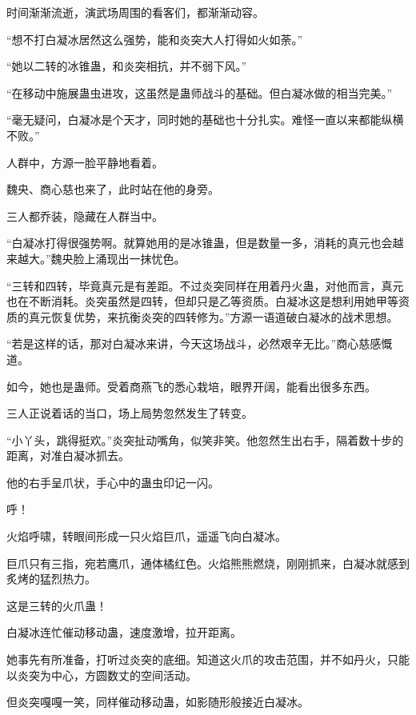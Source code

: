 
\begin{this_body}



时间渐渐流逝，演武场周围的看客们，都渐渐动容。

“想不打白凝冰居然这么强势，能和炎突大人打得如火如荼。”

“她以二转的冰锥蛊，和炎突相抗，并不弱下风。”

“在移动中施展蛊虫进攻，这虽然是蛊师战斗的基础。但白凝冰做的相当完美。”

“毫无疑问，白凝冰是个天才，同时她的基础也十分扎实。难怪一直以来都能纵横不败。”

人群中，方源一脸平静地看着。

魏央、商心慈也来了，此时站在他的身旁。

三人都乔装，隐藏在人群当中。

“白凝冰打得很强势啊。就算她用的是冰锥蛊，但是数量一多，消耗的真元也会越来越大。”魏央脸上涌现出一抹忧色。

“三转和四转，毕竟真元是有差距。不过炎突同样在用着丹火蛊，对他而言，真元也在不断消耗。炎突虽然是四转，但却只是乙等资质。白凝冰这是想利用她甲等资质的真元恢复优势，来抗衡炎突的四转修为。”方源一语道破白凝冰的战术思想。

“若是这样的话，那对白凝冰来讲，今天这场战斗，必然艰辛无比。”商心慈感慨道。

如今，她也是蛊师。受着商燕飞的悉心栽培，眼界开阔，能看出很多东西。

三人正说着话的当口，场上局势忽然发生了转变。

“小丫头，跳得挺欢。”炎突扯动嘴角，似笑非笑。他忽然生出右手，隔着数十步的距离，对准白凝冰抓去。

他的右手呈爪状，手心中的蛊虫印记一闪。

呼！

火焰呼啸，转眼间形成一只火焰巨爪，遥遥飞向白凝冰。

巨爪只有三指，宛若鹰爪，通体橘红色。火焰熊熊燃烧，刚刚抓来，白凝冰就感到炙烤的猛烈热力。

这是三转的火爪蛊！

白凝冰连忙催动移动蛊，速度激增，拉开距离。

她事先有所准备，打听过炎突的底细。知道这火爪的攻击范围，并不如丹火，只能以炎突为中心，方圆数丈的空间活动。

但炎突嘎嘎一笑，同样催动移动蛊，如影随形般接近白凝冰。


\end{this_body}
